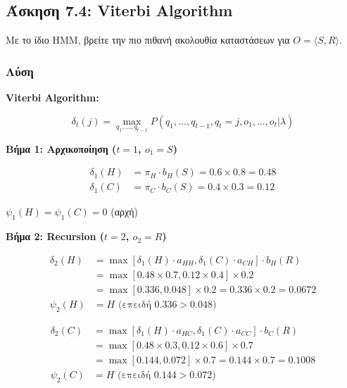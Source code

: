 \subsection{Άσκηση 7.4: Viterbi Algorithm}

\begin{formulabox}[Εκφώνηση]
Με το ίδιο HMM, βρείτε την πιο πιθανή ακολουθία καταστάσεων για $O = \langle S, R \rangle$.
\end{formulabox}

\subsubsection*{Λύση}

\textbf{Viterbi Algorithm:}

$$\delta_t(j) = \max_{q_1,...,q_{t-1}} P(q_1,...,q_{t-1}, q_t=j, o_1,...,o_t | \lambda)$$

\textbf{Βήμα 1: Αρχικοποίηση ($t=1$, $o_1 = S$)}

\begin{align*}
\delta_1(H) &= \pi_H \cdot b_H(S) = 0.6 \times 0.8 = 0.48 \\
\delta_1(C) &= \pi_C \cdot b_C(S) = 0.4 \times 0.3 = 0.12
\end{align*}

$\psi_1(H) = \psi_1(C) = 0$ (αρχή)

\textbf{Βήμα 2: Recursion ($t=2$, $o_2 = R$)}

\begin{align*}
\delta_2(H) &= \max[\delta_1(H) \cdot a_{HH}, \delta_1(C) \cdot a_{CH}] \cdot b_H(R) \\
&= \max[0.48 \times 0.7, 0.12 \times 0.4] \times 0.2 \\
&= \max[0.336, 0.048] \times 0.2 = 0.336 \times 0.2 = 0.0672 \\
\psi_2(H) &= H \text{ (επειδή } 0.336 > 0.048\text{)}
\end{align*}

\begin{align*}
\delta_2(C) &= \max[\delta_1(H) \cdot a_{HC}, \delta_1(C) \cdot a_{CC}] \cdot b_C(R) \\
&= \max[0.48 \times 0.3, 0.12 \times 0.6] \times 0.7 \\
&= \max[0.144, 0.072] \times 0.7 = 0.144 \times 0.7 = 0.1008 \\
\psi_2(C) &= H \text{ (επειδή } 0.144 > 0.072\text{)}
\end{align*}

